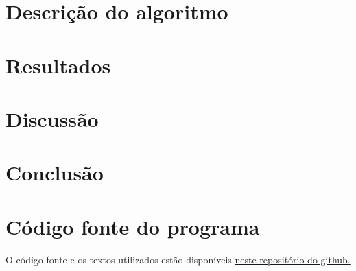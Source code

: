 \documentclass[journal,comsoc]{IEEEtran}
\begin{document}
	\section{Descrição do algoritmo}
	
	\section{Resultados}
	
	\section{Discussão}
	
	\section{Conclusão}
	
	\appendices
	\section{Código fonte do programa}
	O código fonte e os textos utilizados estão disponíveis \href{https://github.com/DylanNS/LAB-3_ELE-32_2017}{neste repositório do github.}
	
\end{document}

